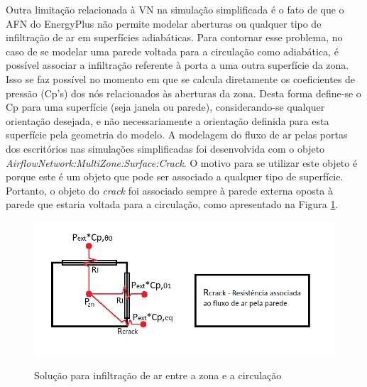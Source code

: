 \documentclass[brazil,hardcopy,openany,a5paper]{ufscthesis}
\begin{document}
		Outra limitação relacionada à VN na simulação simplificada é o fato de que o AFN do EnergyPlus não permite modelar aberturas ou qualquer tipo de infiltração de ar em superfícies adiabáticas. Para contornar esse problema, no caso de se modelar uma parede voltada para a circulação como adiabática, é possível associar a infiltração referente à porta a uma outra superfície da zona.  %
		Isso se faz possível no momento em que se calcula diretamente os coeficientes de pressão (Cp's) dos nós relacionados às aberturas da zona.
		Desta forma define-se o Cp para uma superfície (seja janela ou parede), considerando-se qualquer orientação desejada, e não necessariamente a orientação definida para esta superfície pela geometria do modelo.		
		A modelagem do fluxo de ar pelas portas dos escritórios nas simulações simplificadas foi desenvolvida com o objeto \textit{AirflowNetwork:MultiZone:Surface:Crack}. O motivo para se utilizar este objeto é porque este é um objeto que pode ser associado a qualquer tipo de superfície. Portanto, o objeto do \textit{crack} foi associado sempre à parede externa oposta à parede que estaria voltada para a circulação, como apresentado na Figura \ref{fig:AFN_crack}.
		
		\begin{figure}[h]
			\centering
			\caption{Solução para infiltração de ar entre a zona e a circulação}
			\includegraphics[width=1\linewidth]{img/AFN_crack.png}
			\label{fig:AFN_crack}
		\end{figure}	
					
\end{document}
